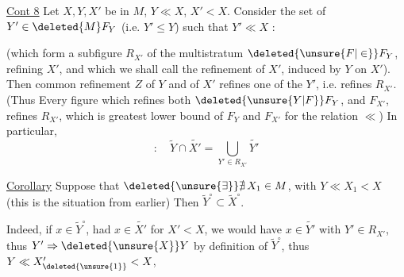 \uline{Cont 8} Let $X,Y,X'$ be in $M$, $Y\ll X$, $X'<X$. Consider the set of $Y'\in\deleted{ M}F_Y$ (i.e. $Y'\leq Y$) such that $Y'\ll X$ :

(which form a subfigure $R_{X'}$ of the multistratum $\deleted{\unsure{F|\in}}F_Y$,  refining $X'$, and which we shall call the refinement of $X'$, induced by $Y$ on $X'$). Then  common refinement $Z$ of $Y$ and of $X'$ refines one of the $Y'$, i.e. refines $R_{X'}$. (Thus Every figure which refines both $\deleted{\unsure{Y|F}}F_Y$, and $F_{X'}$, refines $R_{X'}$, which is  greatest lower bound of $F_Y$ and $F_{X'}$ for the relation $\ll$) In particular,
\[
 :\quad \widetilde Y\cap\widetilde{X'}=\bigcup_{Y'\in R_{X'}}\widetilde{Y'}
\]

\uline{Corollary}  Suppose that $\deleted{\unsure{\exists}}\nexists\,X_1\in M$, with $Y\ll X_1<X$ (this is the situation from earlier) Then $\widetilde Y^\circ\subset\widetilde X^\circ$.

Indeed, if $x\in\widetilde Y^\circ$,  had $x\in\widetilde{X'}$ for $X'<X$, we would have $x\in\widetilde{Y'}$ with $Y'\in R_{X'}$, thus $Y'\Rightarrow\deleted{\unsure{X}}Y$ by definition of $\widetilde Y^\circ$, thus $Y\ll X'_{\deleted{\unsure{1}}}<X$, 
